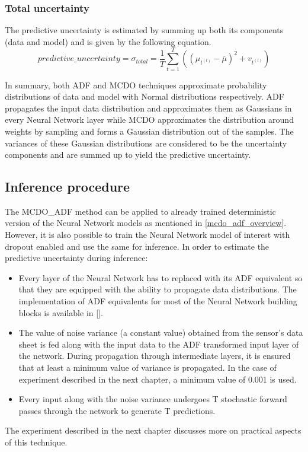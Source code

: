 	\subsubsection{Total uncertainty}
	The predictive uncertainty is estimated by summing up both its components (data and model) and is given by the following equation.
	\begin{equation}
		predictive\_uncertainty = \sigma_{total} =  \frac{1}{T}\sum_{t=1}^{T}((\mu_{t^{(l)}}-\overline{\mu})^2 + v_{t^{(l)}})
	\end{equation}
	
	
	In summary, both ADF and MCDO techniques approximate probability distributions of data and model with Normal distributions respectively. ADF propagates the input data distribution and approximates them as Gaussians in every Neural Network layer while MCDO approximates the distribution around weights by sampling and forms a Gaussian distribution out of the samples. The variances of these Gaussian distributions are considered to be the uncertainty components and are summed up to yield the predictive uncertainty.
	
	\subsection{Inference procedure}\label{sec_mcdo_adf}
	The MCDO\_ADF method can be applied to already trained deterministic version of the Neural Network models as mentioned in \ref{mcdo_adf_overview}. However, it is also possible to train the Neural Network model of interest with dropout enabled and use the same for inference.
	In order to estimate the predictive uncertainty during inference:
	\begin{itemize}
		\item Every layer of the Neural Network has to replaced with its ADF equivalent so that they are equipped with the ability to propagate data distributions. The implementation of ADF equivalents for most of the Neural Network building blocks is available in [].
		\item The value of noise variance (a constant value) obtained from the sensor's data sheet is fed along with the input data to the ADF transformed input layer of the network. During propagation through intermediate layers, it is ensured that at least a minimum value of variance is propagated. In the case of experiment described in the next chapter, a minimum value of 0.001 is used.
		\item Every input along with the noise variance undergoes T stochastic forward passes through the network to generate T predictions.  
	\end{itemize}
	The experiment described in the next chapter discusses more on practical aspects of this technique.    
